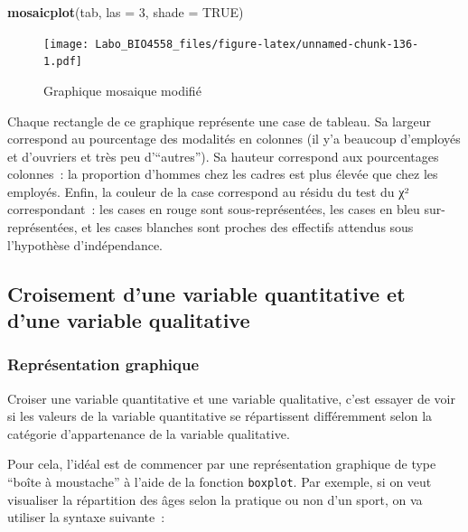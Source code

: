 \documentclass[
  12pt,
]{book}
\newenvironment{Shaded}{\begin{snugshade}}{\end{snugshade}}
\newcommand{\DataTypeTok}[1]{\textcolor[rgb]{0.13,0.29,0.53}{#1}}
\newcommand{\DecValTok}[1]{\textcolor[rgb]{0.00,0.00,0.81}{#1}}
\newcommand{\KeywordTok}[1]{\textcolor[rgb]{0.13,0.29,0.53}{\textbf{#1}}}
\newcommand{\NormalTok}[1]{#1}
\newcommand{\OtherTok}[1]{\textcolor[rgb]{0.56,0.35,0.01}{#1}}
\begin{document}
\begin{Shaded}
\begin{Highlighting}[]
\KeywordTok{mosaicplot}\NormalTok{(tab, }\DataTypeTok{las =} \DecValTok{3}\NormalTok{, }\DataTypeTok{shade =} \OtherTok{TRUE}\NormalTok{)}
\end{Highlighting}
\end{Shaded}

\begin{figure}
\centering
\texttt{[image: Labo\_BIO4558\_files/figure-latex/unnamed-chunk-136-1.pdf]}
\caption{\label{fig:unnamed-chunk-136}Graphique mosaique modifié}
\end{figure}

Chaque rectangle de ce graphique représente une case de tableau. Sa largeur correspond au pourcentage des modalités en colonnes (il y'a beaucoup d'employés et d'ouvriers et très peu d'``autres''). Sa hauteur correspond aux pourcentages colonnes~: la proportion d'hommes chez les cadres est plus élevée que chez les employés. Enfin, la couleur de la case correspond au résidu du test du χ² correspondant~: les cases en rouge sont sous-représentées, les cases en bleu sur-représentées, et les cases blanches sont proches des effectifs attendus sous l'hypothèse d'indépendance.

\hypertarget{croisement-dune-variable-quantitative-et-dune-variable-qualitative}{%
\subsection{Croisement d'une variable quantitative et d'une variable qualitative}\label{croisement-dune-variable-quantitative-et-dune-variable-qualitative}}

\hypertarget{repruxe9sentation-graphique-2}{%
\subsubsection{Représentation graphique}\label{repruxe9sentation-graphique-2}}

Croiser une variable quantitative et une variable qualitative, c'est essayer de voir si les valeurs de la variable quantitative se répartissent différemment selon la catégorie d'appartenance de la variable qualitative.

Pour cela, l'idéal est de commencer par une représentation graphique de type ``boîte à moustache'' à l'aide de la fonction \texttt{boxplot}. Par exemple, si on veut visualiser la répartition des âges selon la pratique ou non d'un sport, on va utiliser la syntaxe suivante~:
\end{document}
